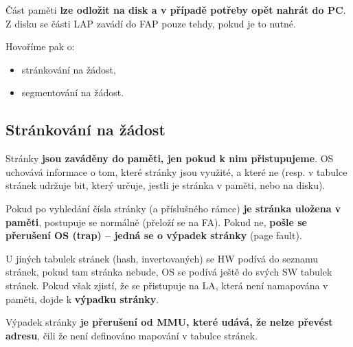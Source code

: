 \documentclass[a4paper, 11pt]{article}
\begin{document}
Část paměti \textbf{lze odložit na disk a v případě potřeby opět nahrát do PC}. Z disku se části LAP zavádí do FAP pouze tehdy, pokud je to nutné.
 
Hovoříme pak o:
\begin{itemize}
    \item stránkování na žádost,
    \item segmentování na žádost.
\end{itemize}
 
\subsection{Stránkování na žádost} \label{strankovani-na-zadost}
Stránky \textbf{jsou zaváděny do paměti, jen pokud k nim přistupujeme}. OS uchovává informace o tom, které stránky jsou využité, a které ne (resp. v tabulce stránek udržuje bit, který určuje, jestli je stránka v paměti, nebo na disku).
 
Pokud po vyhledání čísla stránky (a příslušného rámce) \textbf{je stránka uložena v paměti}, postupuje se normálně (přeloží se na FA). Pokud ne, \textbf{pošle se přerušení OS (trap) -- jedná se o výpadek stránky} (page fault).
 
U jiných tabulek stránek (hash, invertovaných) se HW podívá do seznamu stránek, pokud tam stránka nebude, OS se podívá ještě do svých SW tabulek stránek. Pokud však zjistí, že se přistupuje na LA, která není namapována v paměti, dojde k \textbf{výpadku stránky}.
 
Výpadek stránky \textbf{je přerušení od MMU, které udává, že nelze převést adresu}, čili že není definováno mapování v tabulce stránek.
 
\end{document}
